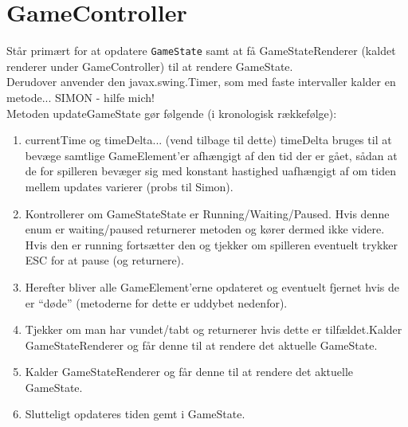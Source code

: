 \documentclass[danish]{article}
\newcommand{\code}[1]{\texttt{#1}}
\begin{document}
\section{GameController}
Står primært for at opdatere \code{GameState} samt at få GameStateRenderer (kaldet renderer under GameController) til at rendere GameState.
\\Derudover anvender den javax.swing.Timer, som med faste intervaller kalder en metode... SIMON - hilfe mich!
\\Metoden updateGameState gør følgende (i kronologisk rækkefølge):
\begin{enumerate}
\item currentTime og timeDelta... (vend tilbage til dette) timeDelta bruges til at bevæge samtlige GameElement’er afhængigt af den tid der er gået, sådan at de for spilleren bevæger sig med konstant hastighed uafhængigt af om tiden mellem updates varierer (probs til Simon).
\item Kontrollerer om GameStateState er Running/Waiting/Paused. Hvis denne enum er waiting/paused returnerer metoden og kører dermed ikke videre. Hvis den er running fortsætter den og tjekker om spilleren eventuelt trykker ESC for at pause (og returnere).
\item Herefter bliver alle GameElement’erne opdateret og eventuelt fjernet hvis de er “døde” (metoderne for dette er uddybet nedenfor).
\item Tjekker om man har vundet/tabt og returnerer hvis dette er tilfældet.Kalder GameStateRenderer og får denne til at rendere det aktuelle GameState.
\item Kalder GameStateRenderer og får denne til at rendere det aktuelle GameState.
\item Slutteligt opdateres tiden gemt i GameState.
\end{enumerate}
\end{document}
